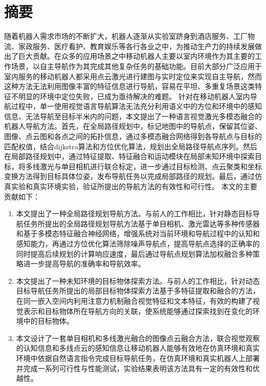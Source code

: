 \chapter{摘\texorpdfstring{\quad}{}要}
    随着机器人需求市场的不断扩大，机器人逐渐从实验室跻身到酒店服务、工厂物流、家政服务、医疗看护、教育娱乐等各行各业之中，为推动生产力的持续发展做出了巨大贡献。在众多的应用场景之中移动机器人主要以室内环境作为其主要的工作场景，以自主导航作为其完成其他复杂任务的基础功能。目前大部分广泛应用于室内服务的移动机器人都采用点云激光进行建图与实时定位来实现自主导航，然而这种方法无法利用图像丰富的特征信息进行导航，容易在平坦、多重复场景这类特征不明显的环境中定位失败，已成为亟待解决的难题。
    针对在移动机器人室内导航过程中，单一使用视觉语言导航算法无法充分利用语义中的方位和环境中的感知信息、无法导航至目标半米内的问题，本文提出了一种语言视觉激光多模态融合的机器人导航方法。首先，在全局路径规划中，标记地图中的导航点，保留其位姿、图像、点云图和各点之间的拓扑信息，通过多模态融合网络得到各导航点与目标的匹配权值，结合dijkstra算法和方位优化算法，规划出全局路径导航点序列。然后在局部路径规划中，通过特征提取、特征融合和运动模块在局部未知环境中探索目标，将多线激光与单目相机进行联合标定，进一步通过目标检测、点云聚类和坐标变换方法得到目标具体位姿，发布导航任务以完成局部路径的规划。最后，通过仿真实验和真实环境实验，验证所提出的导航方法的有效性和可行性。
    本文的主要贡献如下：
\begin{enumerate}[topsep = 0 pt, itemsep= 0 pt, parsep=0pt, partopsep=0pt, leftmargin=44pt, itemindent=0pt, labelsep=6pt, label=(\arabic*)]
    \item 	本文提出了一种全局路径规划导航方法。与前人的工作相比，针对静态目标导航任务所提出的全局路径规划导航方法基于单目相机、激光雷达等多种传感器和基于多模态特征融合神经网络，增强系统对当前环境和导航过程中的认知和感知能力，再通过方位优化算法筛除噪声导航点，提高导航点选择的正确率的同时提高后续规划的计算响应速度，最后通过导航点规划算法加权融合多种策略进一步提高导航的准确率和导航效率。
    \item	本文提出了一种未知环境的目标物体探索方法。与前人的工作相比，针对动态目标导航任务所提出的局部目标物体探索方法基于多特征提取和融合的方法，在同一嵌入空间内利用注意力机制融合视觉特征和文本特征，有效的构建了视觉表示和目标物体所在导航方向的关联，使系统能够通过探索找到在变化的环境中的目标物体。
    \item	本文设计了一套单目相机和多线激光融合的图像点云融合方法，联合视觉观察的认知信息和多线点云的感知信息让移动机器人能够有效地在仿真环境和真实环境中依据自然语言指令完成目标导航任务，在仿真环境和真实机器人上部署并完成一系列可行性与性能测试，实验结果表明该方法具有一定的有效性和优越性。
\end{enumerate}

